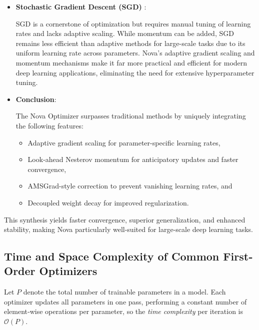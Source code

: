 \documentclass{article}
\begin{document}
\begin{itemize}
where $g_t$ is the gradient at step $t$. Nova’s integration of Nesterov momentum and AMSGrad ensures faster and more stable convergence by leveraging both adaptive scaling and anticipatory updates.

\item \textbf{Stochastic Gradient Descent (SGD)} \cite{Robbins1951}: 

SGD is a cornerstone of optimization but requires manual tuning of learning rates and lacks adaptive scaling. While momentum can be added, SGD remains less efficient than adaptive methods for large-scale tasks due to its uniform learning rate across parameters. Nova’s adaptive gradient scaling and momentum mechanisms make it far more practical and efficient for modern deep learning applications, eliminating the need for extensive hyperparameter tuning.

\item {\bf Conclusion}:

The Nova Optimizer surpasses traditional methods by uniquely integrating the following features:

\begin{itemize}
    \item Adaptive gradient scaling for parameter-specific learning rates,
    \item Look-ahead Nesterov momentum for anticipatory updates and faster convergence,
    \item AMSGrad-style correction to prevent vanishing learning rates, and
    \item Decoupled weight decay for improved regularization.
\end{itemize}


\end{itemize}


This synthesis yields faster convergence, superior generalization, and enhanced stability, making Nova particularly well-suited for large-scale deep learning tasks.



\subsection{Time and Space Complexity of Common First‐Order Optimizers}


Let $P$ denote the total number of trainable parameters in a model.  Each optimizer updates all parameters in one pass, performing a constant number of element‐wise operations per parameter, so the \emph{time complexity} per iteration is $ \mathcal{O}(P)$.
 
\end{document}
